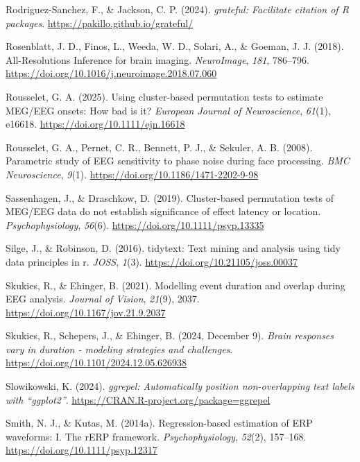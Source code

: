 \documentclass[
  doc,
  floatsintext,
  longtable,
  a4paper,
  nolmodern,
  notxfonts,
  notimes,
  colorlinks=true,linkcolor=blue,citecolor=blue,urlcolor=blue]{apa7}
\newlength{\cslhangindent}
\newenvironment{CSLReferences}[2] %
 {\begin{list}{}{%
  \setlength{\itemindent}{0pt}
  \setlength{\leftmargin}{0pt}
  \setlength{\parsep}{0pt}
  \ifodd #1
   \setlength{\leftmargin}{\cslhangindent}
   \setlength{\itemindent}{-1\cslhangindent}
  \fi
  \setlength{\itemsep}{#2\baselineskip}}}
 {\end{list}}
\begin{document}
\begin{CSLReferences}{1}{0}
Rodriguez-Sanchez, F., \& Jackson, C. P. (2024). \emph{{grateful}:
Facilitate citation of {R} packages}.
\url{https://pakillo.github.io/grateful/}

Rosenblatt, J. D., Finos, L., Weeda, W. D., Solari, A., \& Goeman, J. J.
(2018). All-Resolutions Inference for brain imaging. \emph{NeuroImage},
\emph{181}, 786--796.
\url{https://doi.org/10.1016/j.neuroimage.2018.07.060}

Rousselet, G. A. (2025). Using cluster-based permutation tests to
estimate {MEG}/{EEG} onsets: {How} bad is it? \emph{European Journal of
Neuroscience}, \emph{61}(1), e16618.
\url{https://doi.org/10.1111/ejn.16618}

Rousselet, G. A., Pernet, C. R., Bennett, P. J., \& Sekuler, A. B.
(2008). Parametric study of EEG sensitivity to phase noise during face
processing. \emph{BMC Neuroscience}, \emph{9}(1).
\url{https://doi.org/10.1186/1471-2202-9-98}

Sassenhagen, J., \& Draschkow, D. (2019). Cluster{-}based permutation
tests of MEG/EEG data do not establish significance of effect latency or
location. \emph{Psychophysiology}, \emph{56}(6).
\url{https://doi.org/10.1111/psyp.13335}

Silge, J., \& Robinson, D. (2016). {tidytext}: Text mining and analysis
using tidy data principles in r. \emph{JOSS}, \emph{1}(3).
\url{https://doi.org/10.21105/joss.00037}

Skukies, R., \& Ehinger, B. (2021). Modelling event duration and overlap
during {EEG} analysis. \emph{Journal of Vision}, \emph{21}(9), 2037.
\url{https://doi.org/10.1167/jov.21.9.2037}

Skukies, R., Schepers, J., \& Ehinger, B. (2024, December 9).
\emph{Brain responses vary in duration - modeling strategies and
challenges}. \url{https://doi.org/10.1101/2024.12.05.626938}

Slowikowski, K. (2024). \emph{{ggrepel}: Automatically position
non-overlapping text labels with {``{ggplot2}''}}.
\url{https://CRAN.R-project.org/package=ggrepel}

Smith, N. J., \& Kutas, M. (2014a). Regression{-}based estimation of ERP
waveforms: I. The rERP framework. \emph{Psychophysiology}, \emph{52}(2),
157--168. \url{https://doi.org/10.1111/psyp.12317}


\end{CSLReferences}
\end{document}
